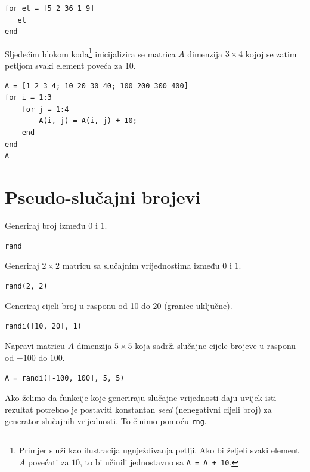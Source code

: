 \documentclass[a4paper, 10pt]{article}
\begin{document}
\begin{lstlisting}
for el = [5 2 36 1 9]
   el
end
\end{lstlisting}

Sljedećim blokom koda\footnote{Primjer služi kao ilustracija ugnježđivanja petlji.
Ako bi željeli svaki element $A$ povećati za $10$, to bi učinili jednostavno sa \texttt{A = A + 10}.}
inicijalizira se matrica $A$ dimenzija $3 \times 4$ kojoj se zatim petljom svaki element poveća za 10.

\begin{lstlisting}
A = [1 2 3 4; 10 20 30 40; 100 200 300 400]
for i = 1:3
    for j = 1:4
        A(i, j) = A(i, j) + 10;
    end
end
A
\end{lstlisting}


\section{Pseudo-slučajni brojevi}

Generiraj broj između $0$ i $1$.

\begin{lstlisting}
rand
\end{lstlisting}

Generiraj $2 \times 2$ matricu sa slučajnim vrijednostima između $0$ i $1$.

\begin{lstlisting}
rand(2, 2)
\end{lstlisting}

Generiraj cijeli broj u rasponu od 10 do 20 (granice uključne).

\begin{lstlisting}
randi([10, 20], 1)
\end{lstlisting}

Napravi matricu $A$ dimenzija $5 \times 5$ koja sadrži slučajne cijele brojeve u rasponu od $-100$ do $100$.

\begin{lstlisting}
A = randi([-100, 100], 5, 5)
\end{lstlisting}

Ako želimo da funkcije koje generiraju slučajne vrijednosti daju uvijek isti rezultat potrebno je postaviti konstantan \emph{seed} (nenegativni cijeli broj) za generator slučajnih vrijednosti.
To činimo pomoću \texttt{rng}.
\end{document}
